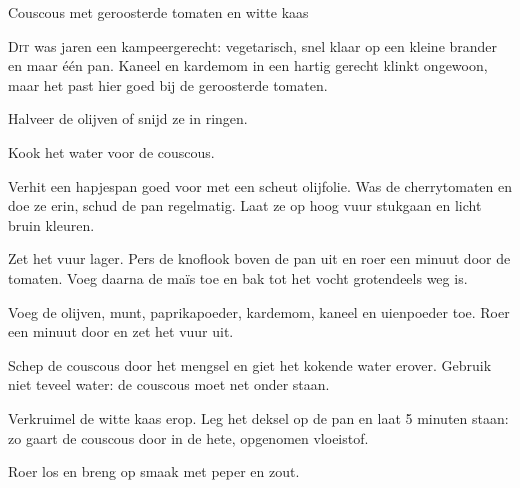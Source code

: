 \begin{recipe}{Couscous met geroosterde tomaten en witte kaas}


\lettrine{D}{it} was jaren een kampeergerecht: vegetarisch, snel klaar op een kleine
brander en maar één pan. Kaneel en kardemom in een hartig gerecht klinkt ongewoon,
maar het past hier goed bij de geroosterde tomaten.

\begin{ingredients}
\end{ingredients}

\begin{steps}
  \item Halveer de olijven of snijd ze in ringen. 
  \item Kook het water voor de couscous.
  \item Verhit een hapjespan goed voor met een scheut olijfolie. Was de cherrytomaten
        en doe ze erin, schud de pan regelmatig. Laat ze op hoog vuur stukgaan en licht bruin
        kleuren.
  \item Zet het vuur lager. Pers de knoflook boven de pan uit en roer een minuut
        door de tomaten. Voeg daarna de maïs toe en bak tot het vocht grotendeels weg is.
  \item Voeg de olijven, munt, paprikapoeder, kardemom, kaneel en uienpoeder toe.
        Roer een minuut door en zet het vuur uit.
  \item Schep de couscous door het mengsel en giet het kokende water erover. 
        Gebruik niet teveel water: de couscous moet net onder staan.
  \item Verkruimel de witte kaas erop. Leg het deksel op de pan en laat 5 minuten
        staan: zo gaart de couscous door in de hete, opgenomen vloeistof. 
  \item Roer los en breng op smaak met peper en zout.
\end{steps}

\end{recipe}

